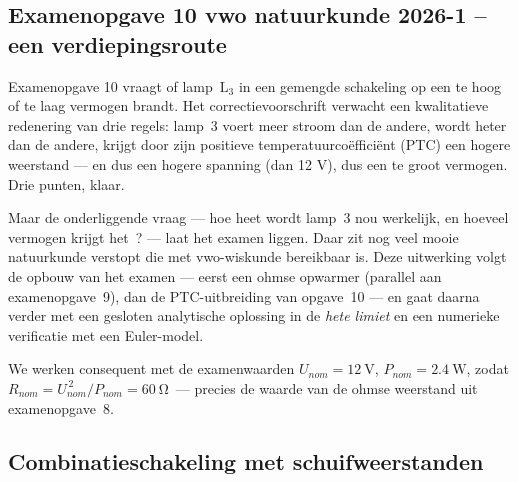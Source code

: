 \documentclass[addpoints,11pt,a4paper]{exam}
\begin{document}
\printanswers
\begin{questions}

\subsection*{Examenopgave 10 vwo natuurkunde 2026-1 -- een verdiepingsroute}
\item[]

Examenopgave 10 vraagt of lamp~$\text{L}_3$ in een gemengde schakeling op een te hoog of te laag vermogen brandt. Het correctievoorschrift verwacht een kwalitatieve redenering van drie regels: lamp~3 voert meer stroom dan de andere, wordt heter dan de andere, krijgt door zijn positieve temperatuurco\"effici\"ent (PTC) een hogere weerstand --- en dus een hogere spanning (dan 12 V), dus een te groot vermogen. Drie punten, klaar.

Maar de onderliggende vraag --- hoe heet wordt lamp~3 nou werkelijk, en hoeveel vermogen krijgt het~? --- laat het examen liggen. Daar zit nog veel mooie natuurkunde verstopt die met vwo-wiskunde bereikbaar is. Deze uitwerking volgt de opbouw van het examen --- eerst een ohmse opwarmer (parallel aan examenopgave~9), dan de PTC-uitbreiding van opgave~10 --- en gaat daarna verder met een gesloten analytische oplossing in de \emph{hete limiet} en een numerieke verificatie met een Euler-model.

We werken consequent met de examenwaarden $U_{nom} = \qty{12}{\V}$, $P_{nom} = \qty{2.4}{\W}$, zodat $R_{nom} = U_{nom}^{\,2}/P_{nom} = \qty{60}{\ohm}$~--- precies de waarde van de ohmse weerstand uit examenopgave~8.

\subsection*{Combinatieschakeling met schuifweerstanden}
\item[]



\end{questions}
\end{document}
